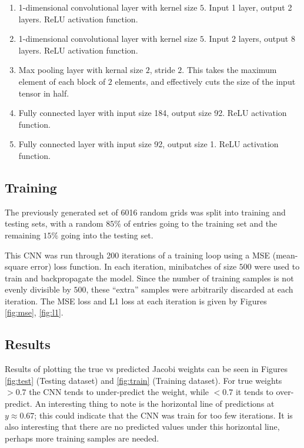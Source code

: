\begin{enumerate}
\item 1-dimensional convolutional layer with kernel size $5$.  Input 1 layer, output 2 layers.  ReLU activation function.
\item 1-dimensional convolutional layer with kernel size $5$.  Input 2 layers, output 8 layers.  ReLU activation function.
\item Max pooling layer with kernal size $2$, stride $2$.  This takes the maximum element of each block of $2$ elements, and effectively cuts the size of the input tensor in half.
\item Fully connected layer with input size 184, output size 92.  ReLU activation function.
\item Fully connected layer with input size 92, output size 1.  ReLU activation function.
\end{enumerate}

\subsection{Training}

The previously generated set of 6016 random grids was split into training and testing sets, with a random $85\%$ of entries going to the training set and the remaining $15\%$ going into the testing set.

This CNN was run through 200 iterations of a training loop using a MSE (mean-square error) loss function.  In each iteration, minibatches of size $500$ were used to train and backpropagate the model.  Since the number of training samples is not evenly divisible by $500$, these ``extra'' samples were arbitrarily discarded at each iteration.  The MSE loss and L1 loss at each iteration is given by Figures \ref{fig:mse}, \ref{fig:l1}.

\subsection{Results}

Results of plotting the true vs predicted Jacobi weights can be seen in Figures \ref{fig:test} (Testing dataset) and \ref{fig:train} (Training dataset).  For true weights $>0.7$ the CNN tends to under-predict the weight, while $<0.7$ it tends to over-predict.  An interesting thing to note is the horizontal line of predictions at $y\approx0.67$; this could indicate that the CNN was train for too few iterations.  It is also interesting that there are no predicted values under this horizontal line, perhaps more training samples are needed.


